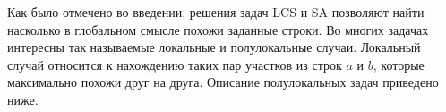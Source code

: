 Как было отмечено во введении, решения задач {LCS} и {SA} позволяют найти насколько в глобальном смысле похожи заданные строки.
Во многих задачах интересны так называемые локальные и полулокальные случаи.
Локальный случай относится к нахождению таких пар участков из строк $a$ и $b$, которые максимально похожи друг на друга.
Описание полулокальных задач приведено ниже.



